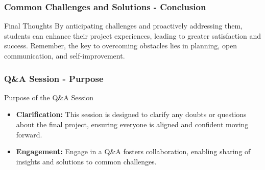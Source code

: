 \documentclass{beamer}
\begin{document}
\begin{frame}[fragile]
    \frametitle{Common Challenges and Solutions - Conclusion}
    \begin{block}{Final Thoughts}
        By anticipating challenges and proactively addressing them, students can enhance their project experiences, leading to greater satisfaction and success. Remember, the key to overcoming obstacles lies in planning, open communication, and self-improvement.
    \end{block}
\end{frame}

\begin{frame}[fragile]
    \frametitle{Q\&A Session - Purpose}
    \begin{block}{Purpose of the Q\&A Session}
        \begin{itemize}
            \item \textbf{Clarification:} This session is designed to clarify any doubts or questions about the final project, ensuring everyone is aligned and confident moving forward.
            \item \textbf{Engagement:} Engage in a Q\&A fosters collaboration, enabling sharing of insights and solutions to common challenges.
        \end{itemize}
    \end{block}
\end{frame}
\end{document}

